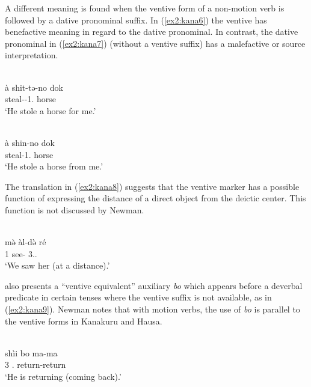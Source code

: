 A different meaning is found when the ventive form of a non-motion verb is followed by a dative pronominal suffix. In (\ref{ex2:kana6}) the ventive has benefactive meaning in regard to the dative pronominal. In contrast, the dative pronominal in (\ref{ex2:kana7}) (without a ventive suffix) has a malefactive or source interpretation.

\ea\label{ex2:kana6}
 \\
\gll à	shit-tə-no	dok \\
	steal--1.	horse \\
\glt `He stole a horse for me.'

\ex\label{ex2:kana7}
 \\
\gll  à	shin-no	dok \\
	steal-1.	horse \\
\glt `He stole a horse from me.'
\z 

The translation in (\ref{ex2:kana8}) suggests that the ventive marker has a possible function of expressing the distance of a direct object from the deictic center. This function is not discussed by Newman.

\ea\label{ex2:kana8}
 \\
\gll mə̀	àl-də̀	ré \\
1	see-	3.. \\
\glt `We saw her (at a distance).'
\z 

\citet[76]{newmanKanakuruLanguage1974} also presents a ``ventive equivalent'' auxiliary \textit{bo} which appears before a deverbal predicate in certain tenses where the ventive suffix is not available, as in (\ref{ex2:kana9}). Newman notes that with motion verbs, the use of \textit{bo} is parallel to the ventive forms in Kanakuru and Hausa. 

\ea\label{ex2:kana9}
 \\
\gll shìi	bo	ma-ma	\\
3	.	return-return	 \\
\glt `He is returning (coming back).'
\z 

